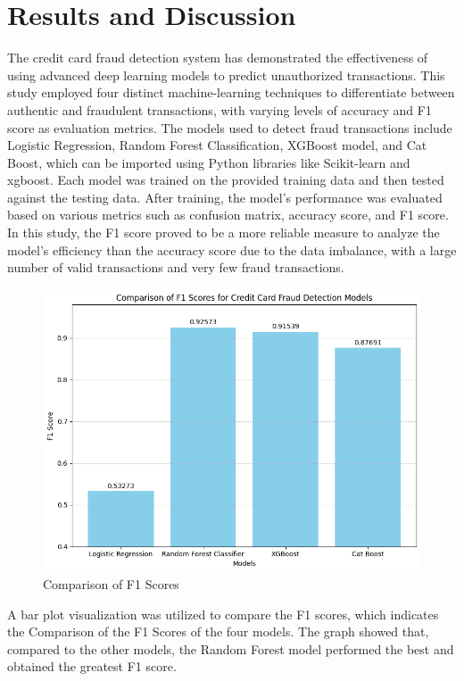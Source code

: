 \chapter{Results and Discussion}
\label{ch:results}


The credit card fraud detection system has demonstrated the effectiveness of using advanced deep learning models to predict unauthorized transactions. This study employed four distinct machine-learning techniques to differentiate between authentic and fraudulent transactions, with varying levels of accuracy and F1 score as evaluation metrics. The models used to detect fraud transactions include Logistic Regression, Random Forest Classification, XGBoost model, and Cat Boost, which can be imported using Python libraries like Scikit-learn and xgboost. Each model was trained on the provided training data and then tested against the testing data. After training, the model's performance was evaluated based on various metrics such as confusion matrix, accuracy score, and F1 score. In this study, the F1 score proved to be a more reliable measure to analyze the model's efficiency than the accuracy score due to the data imbalance, with a large number of valid transactions and very few fraud transactions.



 \begin{figure}[ht]
    \centering
    \includegraphics[scale=0.5]{figures/FinalPlot.png}
    \caption{Comparison of F1 Scores}
    \label{fig:Data Preprocessing}
\end{figure}
\clearpage


A bar plot visualization was utilized to compare the F1 scores, which indicates the Comparison of the F1 Scores of the four models. The graph showed that, compared to the other models, the Random Forest model performed the best and obtained the greatest F1 score.

